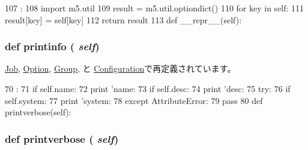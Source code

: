 \begin{DoxyCode}
107                         :
108         import m5.util
109         result = m5.util.optiondict()
110         for key in self:
111             result[key] = self[key]
112         return result
113 
    def __repr__(self):
\end{DoxyCode}
\hypertarget{classm5_1_1util_1_1jobfile_1_1Data_a40bc1aa85be1c4ba18cd144234c53984}{
\subsubsection[{printinfo}]{\setlength{\rightskip}{0pt plus 5cm}def printinfo ( {\em self})}}
\label{classm5_1_1util_1_1jobfile_1_1Data_a40bc1aa85be1c4ba18cd144234c53984}


\hyperlink{classm5_1_1util_1_1jobfile_1_1Job_a40bc1aa85be1c4ba18cd144234c53984}{Job}, \hyperlink{classm5_1_1util_1_1jobfile_1_1Option_a40bc1aa85be1c4ba18cd144234c53984}{Option}, \hyperlink{classm5_1_1util_1_1jobfile_1_1Group_a40bc1aa85be1c4ba18cd144234c53984}{Group}, と \hyperlink{classm5_1_1util_1_1jobfile_1_1Configuration_a40bc1aa85be1c4ba18cd144234c53984}{Configuration}で再定義されています。


\begin{DoxyCode}
70                        :
71         if self.name:
72             print 'name: %
73         if self.desc:
74             print 'desc: %
75         try:
76             if self.system:
77                 print 'system: %
78         except AttributeError:
79             pass
80 
    def printverbose(self):
\end{DoxyCode}
\hypertarget{classm5_1_1util_1_1jobfile_1_1Data_ad0eb102892682fd4530443de1a21b627}{
\subsubsection[{printverbose}]{\setlength{\rightskip}{0pt plus 5cm}def printverbose ( {\em self})}}
\label{classm5_1_1util_1_1jobfile_1_1Data_ad0eb102892682fd4530443de1a21b627}



